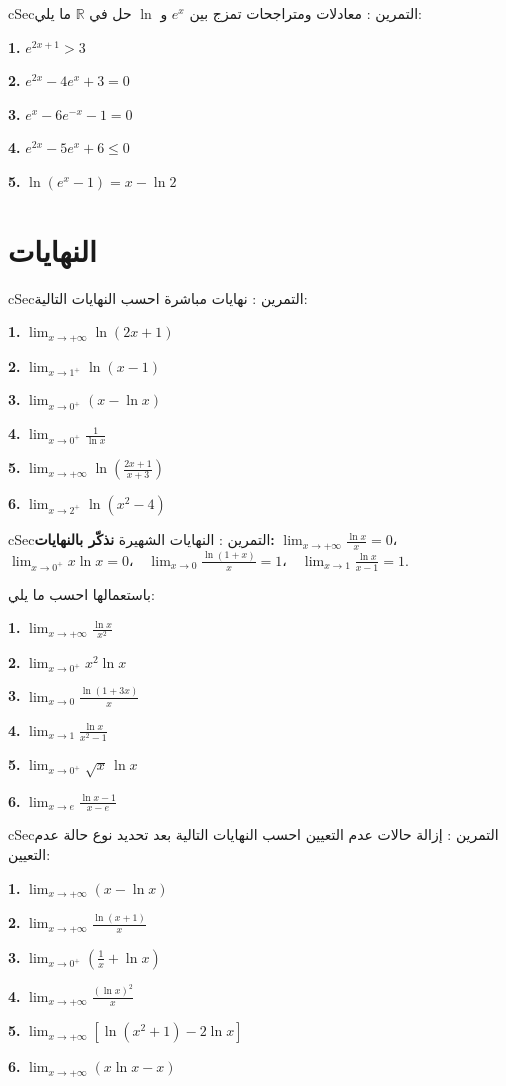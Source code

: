 \documentclass[12pt,a4paper]{article}
\newenvironment{BOX}[2]{\begin{otherlanguage}{english}\begin{arbox}{#1}{#2}}{\end{arbox}\end{otherlanguage}}
\newcounter{exo}
\newenvironment{tamrin}[1]{\stepcounter{exo}\begin{BOX}{cSec}{التمرين \theexo: #1}}{\end{BOX}}
\newcommand{\R}{\mathbb{R}}
\newcommand{\QQ}[1]{\par\smallskip\textbf{#1.} }
\begin{document}
\begin{tamrin}{معادلات ومتراجحات تمزج بين $e^{x}$ و $\ln$}
حل في $\R$ ما يلي:
\QQ{1} $e^{2x+1}>3$
\QQ{2} $e^{2x}-4e^{x}+3=0$
\QQ{3} $e^{x}-6e^{-x}-1=0$
\QQ{4} $e^{2x}-5e^{x}+6\leq 0$
\QQ{5} $\ln\left(e^{x}-1\right)=x-\ln 2$
\end{tamrin}

\section{النهايات}

\begin{tamrin}{نهايات مباشرة}
احسب النهايات التالية:
\QQ{1} $\displaystyle\lim_{x\to+\infty}\ln(2x+1)$
\QQ{2} $\displaystyle\lim_{x\to 1^{+}}\ln(x-1)$
\QQ{3} $\displaystyle\lim_{x\to 0^{+}}\left(x-\ln x\right)$
\QQ{4} $\displaystyle\lim_{x\to 0^{+}}\frac{1}{\ln x}$
\QQ{5} $\displaystyle\lim_{x\to+\infty}\ln\left(\frac{2x+1}{x+3}\right)$
\QQ{6} $\displaystyle\lim_{x\to 2^{+}}\ln\left(x^{2}-4\right)$
\end{tamrin}

\begin{tamrin}{النهايات الشهيرة}
\textbf{نذكّر بالنهايات:}
$\displaystyle\lim_{x\to+\infty}\frac{\ln x}{x}=0$،\ \
$\displaystyle\lim_{x\to 0^{+}}x\ln x=0$،\ \
$\displaystyle\lim_{x\to 0}\frac{\ln(1+x)}{x}=1$،\ \
$\displaystyle\lim_{x\to 1}\frac{\ln x}{x-1}=1$.

باستعمالها احسب ما يلي:
\QQ{1} $\displaystyle\lim_{x\to+\infty}\frac{\ln x}{x^{2}}$
\QQ{2} $\displaystyle\lim_{x\to 0^{+}}x^{2}\ln x$
\QQ{3} $\displaystyle\lim_{x\to 0}\frac{\ln(1+3x)}{x}$
\QQ{4} $\displaystyle\lim_{x\to 1}\frac{\ln x}{x^{2}-1}$
\QQ{5} $\displaystyle\lim_{x\to 0^{+}}\sqrt{x}\,\ln x$
\QQ{6} $\displaystyle\lim_{x\to e}\frac{\ln x-1}{x-e}$
\end{tamrin}

\begin{tamrin}{إزالة حالات عدم التعيين}
احسب النهايات التالية بعد تحديد نوع حالة عدم التعيين:
\QQ{1} $\displaystyle\lim_{x\to+\infty}\left(x-\ln x\right)$
\QQ{2} $\displaystyle\lim_{x\to+\infty}\frac{\ln(x+1)}{x}$
\QQ{3} $\displaystyle\lim_{x\to 0^{+}}\left(\frac1x+\ln x\right)$
\QQ{4} $\displaystyle\lim_{x\to+\infty}\frac{\left(\ln x\right)^{2}}{x}$
\QQ{5} $\displaystyle\lim_{x\to+\infty}\left[\ln\left(x^{2}+1\right)-2\ln x\right]$
\QQ{6} $\displaystyle\lim_{x\to+\infty}\left(x\ln x-x\right)$
\end{tamrin}
\end{document}
